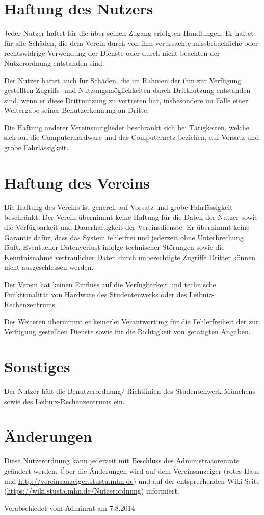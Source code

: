 \documentclass[a4paper,10pt]{scrartcl}
\begin{document}
\section{Haftung des Nutzers}
Jeder Nutzer haftet für die über seinen Zugang erfolgten Handlungen. Er haftet für alle Schäden, die dem Verein durch von ihm verursachte missbräuchliche oder rechtswidrige Verwendung der Dienste oder durch nicht beachten der Nutzerordnung entstanden sind.

Der Nutzer haftet auch für Schäden, die im Rahmen der ihm zur Verfügung gestellten Zugriffs- und Nutzungsmöglichkeiten durch Drittnutzung entstanden sind, wenn er diese Drittnutzung zu vertreten hat, insbesondere im Falle einer Weitergabe seiner Benutzerkennung an Dritte.

Die Haftung anderer Vereinsmitglieder beschränkt sich bei Tätigkeiten, welche sich auf die Computerhardware und das Computernetz beziehen, auf Vorsatz und grobe Fahrlässigkeit.

\section{Haftung des Vereins}
Die Haftung des Vereins ist generell auf Vorsatz und grobe Fahrlässigkeit beschränkt. Der Verein übernimmt keine Haftung für die Daten der Nutzer sowie die Verfügbarkeit und Dauerhaftigkeit der Vereinsdienste. Er übernimmt keine Garantie dafür, dass das System fehlerfrei und jederzeit ohne Unterbrechung läuft. Eventueller Datenverlust infolge technischer Störungen sowie die Kenntnisnahme vertraulicher Daten durch unberechtigte Zugriffe Dritter können nicht ausgeschlossen werden.

Der Verein hat keinen Einfluss auf die Verfügbarkeit und technische Funktionalität von Hardware des Studentenwerks oder des Leibniz-Rechenzentrums.

Des Weiteren übernimmt er keinerlei Verantwortung für die Fehlerfreiheit der zur Verfügung gestellten Dienste sowie für die Richtigkeit von getätigten Angaben.

\section{Sonstiges}
Der Nutzer hält die Benutzerordnung/-Richtlinien des Studentenwerk Münchens sowie des Leibniz-Rechenzentrums ein.

\section{Änderungen}
Diese Nutzerordnung kann jederzeit mit Beschluss des Administratorenrats geändert werden. Über die Änderungen wird auf dem Vereinsanzeiger (rotes Haus und \url{http://vereinsanzeiger.stusta.mhn.de}) und auf der entsprechenden Wiki-Seite (\url{https://wiki.stusta.mhn.de/Nutzerordnung}) informiert. 

\hfill Verabschiedet vom Adminrat am 7.8.2014
\end{document}
